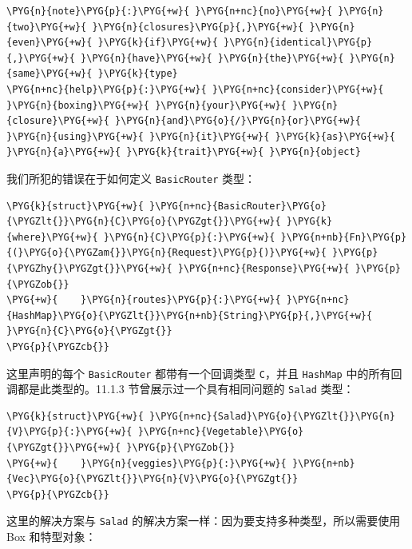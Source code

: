 \begin{Verbatim}[commandchars=\\\{\},breaklines=true,breakanywhere=true,fontsize=\codefont,xleftmargin=17bp]
\PYG{n}{note}\PYG{p}{:}\PYG{+w}{ }\PYG{n+nc}{no}\PYG{+w}{ }\PYG{n}{two}\PYG{+w}{ }\PYG{n}{closures}\PYG{p}{,}\PYG{+w}{ }\PYG{n}{even}\PYG{+w}{ }\PYG{k}{if}\PYG{+w}{ }\PYG{n}{identical}\PYG{p}{,}\PYG{+w}{ }\PYG{n}{have}\PYG{+w}{ }\PYG{n}{the}\PYG{+w}{ }\PYG{n}{same}\PYG{+w}{ }\PYG{k}{type}
\PYG{n+nc}{help}\PYG{p}{:}\PYG{+w}{ }\PYG{n+nc}{consider}\PYG{+w}{ }\PYG{n}{boxing}\PYG{+w}{ }\PYG{n}{your}\PYG{+w}{ }\PYG{n}{closure}\PYG{+w}{ }\PYG{n}{and}\PYG{o}{/}\PYG{n}{or}\PYG{+w}{ }\PYG{n}{using}\PYG{+w}{ }\PYG{n}{it}\PYG{+w}{ }\PYG{k}{as}\PYG{+w}{ }\PYG{n}{a}\PYG{+w}{ }\PYG{k}{trait}\PYG{+w}{ }\PYG{n}{object}
\end{Verbatim}

我们所犯的错误在于如何定义 \texttt{BasicRouter} 类型：

\begin{Verbatim}[commandchars=\\\{\},breaklines=true,breakanywhere=true,fontsize=\codefont,xleftmargin=17bp]
\PYG{k}{struct}\PYG{+w}{ }\PYG{n+nc}{BasicRouter}\PYG{o}{\PYGZlt{}}\PYG{n}{C}\PYG{o}{\PYGZgt{}}\PYG{+w}{ }\PYG{k}{where}\PYG{+w}{ }\PYG{n}{C}\PYG{p}{:}\PYG{+w}{ }\PYG{n+nb}{Fn}\PYG{p}{(}\PYG{o}{\PYGZam{}}\PYG{n}{Request}\PYG{p}{)}\PYG{+w}{ }\PYG{p}{\PYGZhy{}\PYGZgt{}}\PYG{+w}{ }\PYG{n+nc}{Response}\PYG{+w}{ }\PYG{p}{\PYGZob{}}
\PYG{+w}{    }\PYG{n}{routes}\PYG{p}{:}\PYG{+w}{ }\PYG{n+nc}{HashMap}\PYG{o}{\PYGZlt{}}\PYG{n+nb}{String}\PYG{p}{,}\PYG{+w}{ }\PYG{n}{C}\PYG{o}{\PYGZgt{}}
\PYG{p}{\PYGZcb{}}
\end{Verbatim}

这里声明的每个 \texttt{BasicRouter} 都带有一个回调类型 \texttt{C}，并且 \texttt{HashMap} 中的所有回调都是此类型的。11.1.3 节曾展示过一个具有相同问题的 \texttt{Salad} 类型：

\begin{Verbatim}[commandchars=\\\{\},breaklines=true,breakanywhere=true,fontsize=\codefont,xleftmargin=17bp]
\PYG{k}{struct}\PYG{+w}{ }\PYG{n+nc}{Salad}\PYG{o}{\PYGZlt{}}\PYG{n}{V}\PYG{p}{:}\PYG{+w}{ }\PYG{n+nc}{Vegetable}\PYG{o}{\PYGZgt{}}\PYG{+w}{ }\PYG{p}{\PYGZob{}}
\PYG{+w}{    }\PYG{n}{veggies}\PYG{p}{:}\PYG{+w}{ }\PYG{n+nb}{Vec}\PYG{o}{\PYGZlt{}}\PYG{n}{V}\PYG{o}{\PYGZgt{}}
\PYG{p}{\PYGZcb{}}
\end{Verbatim}

这里的解决方案与 \texttt{Salad} 的解决方案一样：因为要支持多种类型，所以需要使用 Box 和特型对象：

